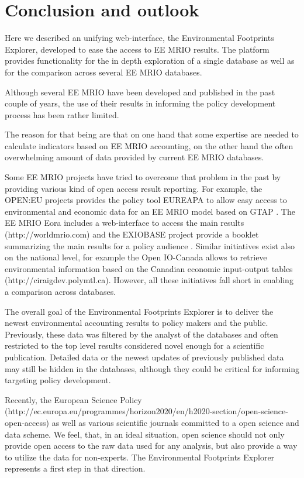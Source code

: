 \section{Conclusion and outlook}

Here we described an unifying web-interface, the Environmental Footprints Explorer, developed to ease the access to EE MRIO results. The platform provides functionality for the in depth exploration of a single database as well as for the comparison across several EE MRIO databases.

Although several EE MRIO have been developed and published in the past couple of years, the use of their results in informing the policy development process has been rather limited. 

The reason for that being are that on one hand that some expertise are needed to calculate indicators based on EE MRIO accounting, on the other hand the often overwhelming amount of data provided by current EE MRIO databases.

Some EE MRIO projects have tried to overcome that problem in the past by providing various kind of open access result reporting. For example, the OPEN:EU projects provides the policy tool EUREAPA to allow easy access to environmental and economic data for an EE MRIO model based on GTAP \cite{Roelich_2014}. The EE MRIO Eora \cite{Lenzen_2013} includes a web-interface to access the main results (http://worldmrio.com) and the EXIOBASE project provide a booklet summarizing the main results for a policy audience \cite{tukker_global_2014}. Similar initiatives exist also on the national level, for example the Open IO-Canada allows to retrieve environmental information based on the Canadian economic input-output tables (http://ciraigdev.polymtl.ca). However, all these initiatives fall short in enabling a comparison across databases.  

The overall goal of the Environmental Footprints Explorer is to deliver the newest environmental accounting results to policy makers and the public. Previously, these data was filtered by the analyst of the databases and often restricted to the top level results considered novel enough for a scientific publication. Detailed data or the newest updates of previously published data may still be hidden in the databases, although they could be critical for informing targeting policy development.

Recently, the European Science Policy (http://ec.europa.eu/programmes/horizon2020/en/h2020-section/open-science-open-access) as well as various scientific journals \cite{Hanson_2011, Stodden_2012, Boulton_2012} committed to a open science and data scheme. We feel, that, in an ideal situation, open science should not only provide open access to the raw data used for any analysis, but also provide a way to utilize the data for non-experts. The Environmental Footprints Explorer represents a first step in that direction.